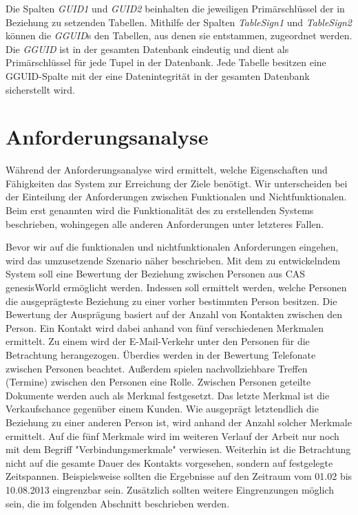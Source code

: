 Die Spalten \textit{GUID1} und \textit{GUID2} beinhalten die jeweiligen Primärschlüssel der in Beziehung zu setzenden Tabellen. Mithilfe der Spalten \textit{TableSign1} und \textit{TableSign2} können die \textit{GGUID}s den Tabellen, aus denen sie entstammen, zugeordnet werden. Die \textit{GGUID} ist in der gesamten Datenbank eindeutig und dient als Primärschlüssel für jede Tupel in der Datenbank. Jede Tabelle besitzen eine GGUID-Spalte mit der eine Datenintegrität in der gesamten Datenbank sicherstellt wird.

\section{Anforderungsanalyse}
\label{ch:Systemanalyse:sec:Anforderungsanalyse}

Während der Anforderungsanalyse wird ermittelt, welche Eigenschaften und Fähigkeiten das System zur Erreichung der Ziele benötigt. Wir unterscheiden bei der Einteilung der Anforderungen zwischen Funktionalen und Nichtfunktionalen. Beim erst genannten wird die Funktionalität des zu erstellenden Systems beschrieben, wohingegen alle anderen Anforderungen unter letzteres Fallen. 

Bevor wir auf die funktionalen und nichtfunktionalen Anforderungen eingehen, wird das umzusetzende Szenario näher beschrieben. Mit dem zu entwickelndem System soll eine Bewertung der Beziehung zwischen Personen aus CAS genesisWorld ermöglicht werden. Indessen soll ermittelt werden, welche Personen die ausgeprägteste Beziehung zu einer vorher bestimmten Person besitzen. Die Bewertung der Ausprägung basiert auf der Anzahl von Kontakten zwischen den Person. Ein Kontakt wird dabei anhand von fünf verschiedenen Merkmalen ermittelt. Zu einem wird der E-Mail-Verkehr unter den Personen für die Betrachtung herangezogen. Überdies werden in der Bewertung Telefonate zwischen Personen beachtet. Außerdem spielen nachvollziehbare Treffen (Termine) zwischen den Personen eine Rolle. Zwischen Personen geteilte Dokumente werden auch als Merkmal festgesetzt. Das letzte Merkmal ist die Verkaufschance gegenüber einem Kunden. Wie ausgeprägt letztendlich die Beziehung zu einer anderen Person ist, wird anhand der Anzahl solcher Merkmale ermittelt. Auf die fünf Merkmale wird im weiteren Verlauf der Arbeit nur noch mit dem Begriff "Verbindungsmerkmale" verwiesen. Weiterhin ist die Betrachtung nicht auf die gesamte Dauer des Kontakts vorgesehen, sondern auf festgelegte Zeitspannen. Beispielsweise sollten die Ergebnisse auf den Zeitraum vom 01.02 bis 10.08.2013 eingrenzbar sein. Zusätzlich sollten weitere Eingrenzungen möglich sein, die im folgenden Abschnitt beschrieben werden.

